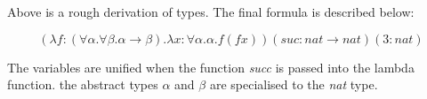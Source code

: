 \documentclass{article}
\begin{document}
Above is a rough derivation of types.
The final formula is described below:

\[
  (\lambda f:(\forall\alpha.\forall\beta.\alpha \to \beta)
  .\lambda x:\forall\alpha. \alpha. f(fx))(suc: nat \to nat)(3:nat)
\]

The variables are unified when the function \textit{succ} is passed into the
lambda function. the abstract types $\alpha$ and $\beta$ are specialised to the
\textit{nat} type.
\end{document}
